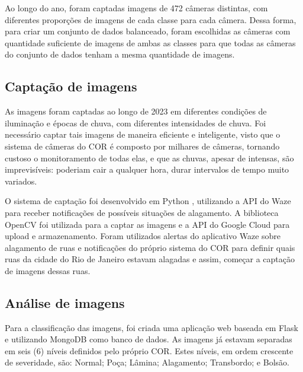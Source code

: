 Ao longo do ano, foram captadas imagens de 472 câmeras distintas, com diferentes proporções de imagens de cada classe para cada câmera. 
Dessa forma, para criar um conjunto de dados balanceado, 
foram escolhidas as câmeras com quantidade suficiente de imagens de ambas as classes para que todas as câmeras do conjunto de dados tenham a mesma quantidade de imagens.

\subsection{Captação de imagens}

As imagens foram captadas ao longo de 2023 em diferentes condições de iluminação e épocas de chuva, com diferentes intensidades de chuva. 
Foi necessário captar tais imagens de maneira eficiente e inteligente, visto que o sistema de câmeras do COR é composto por milhares de câmeras, 
tornando custoso o monitoramento de todas elas, e que as chuvas, apesar de intensas, são imprevisíveis: poderiam cair a qualquer hora, durar intervalos de tempo muito variados.

O sistema de captação foi desenvolvido em Python \cite{van1995python}, utilizando a API do Waze para receber notificações de possíveis situações de alagamento. A biblioteca OpenCV \cite{itseez2015opencv} foi utilizada para a captar as imagens e a API do Google Cloud para upload e armazenamento.
Foram utilizados alertas do aplicativo Waze sobre alagamento de ruas e notificações do próprio sistema do COR para definir quais ruas da cidade do Rio de Janeiro estavam alagadas e assim, começar a captação de imagens dessas ruas. 


\subsection{Análise de imagens}
Para a classificação das imagens, foi criada uma aplicação web baseada em Flask e utilizando MongoDB como banco de dados. 
As imagens já estavam separadas em seis (6) níveis definidos pelo próprio COR. Estes níveis, em ordem crescente de severidade, são: Normal; Poça; Lâmina; Alagamento; Transbordo; e Bolsão. 


